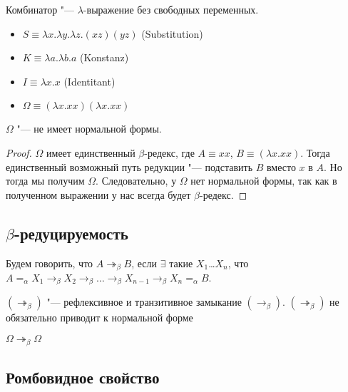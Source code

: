 \begin{definition}
	Комбинатор "--- $\lambda$-выражение без свободных переменных.
\end{definition}

\begin{definition} 
	\hfill
	\begin{itemize}
            \item $S \equiv \lambda{}x. \lambda{}y. \lambda{}z.(x z) (y z)$ (Substitution)
            \item $K \equiv \lambda{}a.\lambda{}b.a$ (Konstanz)
		\item $I \equiv \lambda{}x.x$ (Identitant)
		\item $\Omega \equiv (\lambda{}x.xx)(\lambda{}x.xx)$
	\end{itemize}
\end{definition}

\begin{lemma}
	$\Omega$ "--- не имеет нормальной формы.
\end{lemma}

\begin{proof}
	$\Omega$ имеет единственный $\beta$-редекс, где $A \equiv xx$, $B \equiv (\lambda{}x.xx)$. Тогда единственный возможный путь редукции "--- подставить $B$ вместо $x$ в $A$. Но тогда мы получим $\Omega$. Следовательно, у $\Omega$ нет нормальной формы, так как в полученном выражении у нас всегда будет $\beta$-редекс.
\end{proof}

\subsection{$\beta$-редуцируемость}

\begin{definition}
	Будем говорить, что $A\twoheadrightarrow_{\beta}B$, если $\exists$ такие $X_{1}$\ldots $X_{n}$, что $A=_{\alpha}X_{1}\to_{\beta}X_{2}\to_{\beta}\ldots\to_{\beta}X_{n-1}\to_{\beta}X_{n}=_{\alpha}B$.
\end{definition}

$(\twoheadrightarrow_{\beta})$ "--- рефлексивное и транзитивное замыкание $(\to_{\beta})$. $(\twoheadrightarrow_{\beta})$ не обязательно приводит к нормальной форме
\begin{example}
	$\Omega\twoheadrightarrow_{\beta}\Omega$
\end{example}

\subsection{Ромбовидное свойство}

